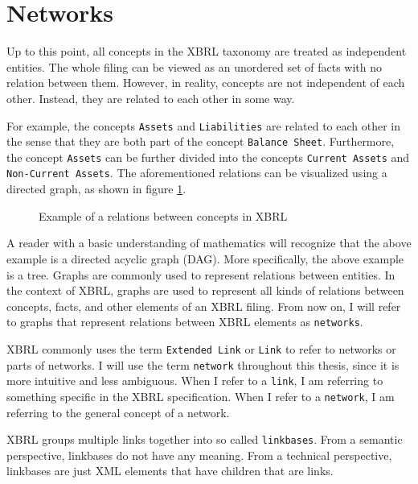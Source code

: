 \section{Networks}
\label{sec:xbrl_networks}

Up to this point, all concepts in the XBRL taxonomy are treated as independent entities.
The whole filing can be viewed as an unordered set of facts with no relation between them.
However, in reality, concepts are not independent of each other.
Instead, they are related to each other in some way.

For example, the concepts \texttt{Assets} and \texttt{Liabilities} are related to each other in the sense that they are both part of the concept \texttt{Balance Sheet}.
Furthermore, the concept \texttt{Assets} can be further divided into the concepts \texttt{Current Assets} and \texttt{Non-Current Assets}.
The aforementioned relations can be visualized using a directed graph, as shown in figure \ref{fig:example_visualization_network_xbrl}.

\begin{figure}[H]
    \caption{Example of a relations between concepts in XBRL}
    \label{fig:example_visualization_network_xbrl}
\end{figure}

A reader with a basic understanding of mathematics will recognize that the above example is a directed acyclic graph (DAG).
More specifically, the above example is a tree.
Graphs are commonly used to represent relations between entities.
In the context of XBRL, graphs are used to represent all kinds of relations between concepts, facts, and other elements of an XBRL filing.
From now on, I will refer to graphs that represent relations between XBRL elements as \texttt{networks}.

XBRL commonly uses the term \texttt{Extended Link} or \texttt{Link} to refer to networks or parts of networks.
I will use the term \texttt{network} throughout this thesis, since it is more intuitive and less ambiguous.
When I refer to a \texttt{link}, I am referring to something specific in the XBRL specification.
When I refer to a \texttt{network}, I am referring to the general concept of a network.

XBRL groups multiple links together into so called \texttt{linkbases}.
From a semantic perspective, linkbases do not have any meaning.
From a technical perspective, linkbases are just XML elements that have children that are links. 

